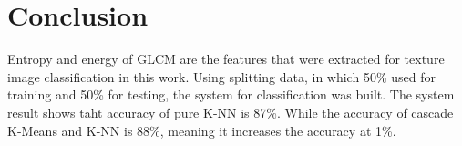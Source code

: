 \documentclass[conference]{IEEEtran}
\begin{document}


%
%


%





\section{Conclusion}

Entropy and energy of GLCM are the features that were extracted for texture image classification in this work. Using splitting data, in which 50\% used for training and 50\% for testing, the system for classification was built. The system result shows taht accuracy of pure K-NN is 87\%. While the accuracy of cascade K-Means and K-NN is 88\%, meaning it increases the accuracy at 1\%. 
\end{document}
